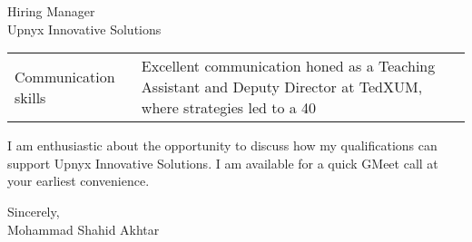 \documentclass[10.5pt]{letter}
\begin{document}
\begin{letter}{Hiring Manager\\
Upnyx Innovative Solutions\\
 [Redacted due to PII in provided prompt] }
\begin{tabularx}{\textwidth}{@{}p{}X@{}}
Communication skills & Excellent communication honed as a Teaching Assistant and Deputy Director at TedXUM, where strategies led to a 40%

\end{tabularx}

\vspace{0.4cm}
I am enthusiastic about the opportunity to discuss how my qualifications can support Upnyx Innovative Solutions. I am available for a quick GMeet call at your earliest convenience.

\vspace{0.4cm}
\begin{flushleft}
Sincerely,\\
[1.5ex]
Mohammad Shahid Akhtar
\end{flushleft}

\end{letter}
\end{document}
